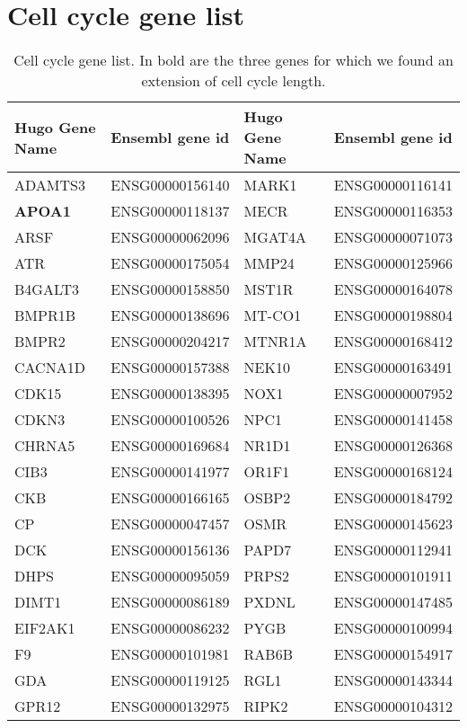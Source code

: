 \section{Cell cycle gene list}
\label{cellcyclelist}
\begin{table}[!ht]
\centering
\caption{Cell cycle gene list. In bold are the three genes for which we found an extension of cell cycle length.}
\begin{tabular}{|l|l||l|l|}
\hline
Hugo Gene Name & Ensembl gene id & Hugo Gene Name & Ensembl gene id\\
\hline
ADAMTS3  &  ENSG00000156140  &  MARK1  &  ENSG00000116141  \\
\textbf{APOA1}  &  ENSG00000118137  &  MECR  &  ENSG00000116353  \\
ARSF  &  ENSG00000062096  &  MGAT4A  &  ENSG00000071073  \\
ATR  &  ENSG00000175054  &  MMP24  &  ENSG00000125966  \\
B4GALT3  &  ENSG00000158850  &  MST1R  &  ENSG00000164078  \\
BMPR1B  &  ENSG00000138696  &  MT-CO1  &  ENSG00000198804  \\
BMPR2  &  ENSG00000204217  &  MTNR1A  &  ENSG00000168412  \\
CACNA1D  &  ENSG00000157388  &  NEK10  &  ENSG00000163491  \\
CDK15  &  ENSG00000138395  &  NOX1  &  ENSG00000007952  \\
CDKN3  &  ENSG00000100526  &  NPC1  &  ENSG00000141458  \\
CHRNA5  &  ENSG00000169684  &  NR1D1  &  ENSG00000126368  \\
CIB3  &  ENSG00000141977  &  OR1F1  &  ENSG00000168124  \\
CKB  &  ENSG00000166165  &  OSBP2  &  ENSG00000184792  \\
CP  &  ENSG00000047457  &  OSMR  &  ENSG00000145623  \\
DCK  &  ENSG00000156136  &  PAPD7  &  ENSG00000112941  \\
DHPS  &  ENSG00000095059  &  PRPS2  &  ENSG00000101911  \\
DIMT1  &  ENSG00000086189  &  PXDNL  &  ENSG00000147485  \\
EIF2AK1  &  ENSG00000086232  &  PYGB  &  ENSG00000100994  \\
F9  &  ENSG00000101981  &  RAB6B  &  ENSG00000154917  \\
GDA  &  ENSG00000119125  &  RGL1  &  ENSG00000143344  \\
GPR12  &  ENSG00000132975  &  RIPK2  &  ENSG00000104312  \\

\end{tabular}
\end{table}

